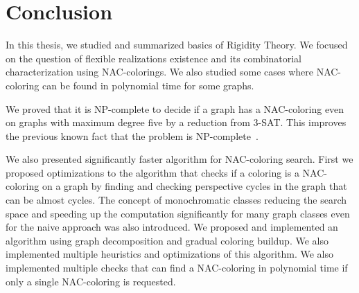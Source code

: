 
\chapter*{Conclusion}



In this thesis,
we studied and summarized basics of Rigidity Theory.
We focused on the question of flexible realizations existence
and its combinatorial characterization using NAC-colorings.
We also studied some cases where NAC-coloring can be found in polynomial time
for some graphs.

We proved that it is NP-complete
to decide if a graph has a NAC-coloring even on graphs with maximum degree five
by a reduction from 3-SAT\@.
This improves the previous known fact that the problem is NP-complete~\cite{np_complete}.

We also presented significantly faster algorithm
for NAC-coloring search.
%
First we proposed optimizations to the algorithm
that checks if a coloring is a NAC-coloring on a graph
by finding and checking perspective cycles in the graph
that can be almost cycles.
%
The concept of monochromatic classes reducing the search space
and speeding up the computation significantly for many graph classes
even for the naive approach was also introduced.
%
We proposed and implemented an algorithm using graph decomposition and gradual coloring buildup.
We also implemented multiple heuristics and optimizations of this algorithm.
%
We also implemented multiple checks that can find a NAC-coloring in polynomial time
if only a single NAC-coloring is requested.

